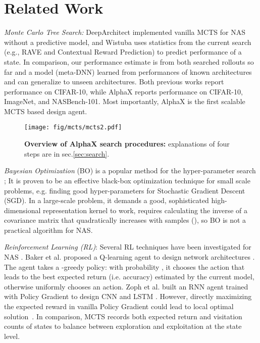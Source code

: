 \documentclass[10pt,twocolumn,letterpaper]{article}
\begin{document}
\section{Related Work}


\textit{Monte Carlo Tree Search:} DeepArchitect\cite{negrinho2017deeparchitect} implemented vanilla MCTS for NAS without a predictive model, and Wistuba \cite{wistuba2017finding} uses statistics from the current search (e.g., RAVE and Contextual Reward Prediction) to predict performance of a state. In comparison, our performance estimate is from both searched rollouts so far and a model (meta-DNN) learned from performances of known architectures and can generalize to unseen architectures. Both previous works report performance on CIFAR-10, while AlphaX reports performance on CIFAR-10, ImageNet, and NASBench-101. Most importantly, AlphaX is the first scalable MCTS based design agent.


\begin{figure}
\vspace{-0.2in}
\centering 
\texttt{[image: fig/mcts/mcts2.pdf]}
\caption{\textbf{Overview of AlphaX search procedures:} explanations of four steps are in sec.\ref{sec:search}.}
\label{fig:mcts-procedures}
\end{figure}

\textit{Bayesian Optimization} (BO) is a popular method for the hyper-parameter search \cite{hutter2011sequential,snoek2012practical,thornton2013auto,kandasamy2015high}; It is proven to be an effective black-box optimization technique for small scale problems, e.g. finding good hyper-parameters for Stochastic Gradient Descent (SGD). In a large-scale problem, it demands a good, sophisticated high-dimensional representation kernel to work, requires calculating the inverse of a covariance matrix  that quadratically increases with samples (), so BO is not a practical algorithm for NAS.





\textit{Reinforcement Learning (RL)}: Several RL techniques have been investigated for NAS \cite{Baker2016,Zoph2016}.
Baker et al. proposed a Q-learning agent to design network architectures \cite{Baker2016}. The agent takes a -greedy policy: with probability , it chooses the action that leads to the best expected return (i.e. accuracy) estimated by the current model, otherwise uniformly chooses an action. Zoph et al. built an RNN agent trained with Policy Gradient to design CNN and LSTM \cite{Zoph2016}. However, directly maximizing the expected reward in vanilla Policy Gradient could lead to local optimal solution~\cite{nachum2016improving}. In comparison, MCTS records both expected return and visitation counts of states to balance between exploration and exploitation at the state level.
\end{document}
